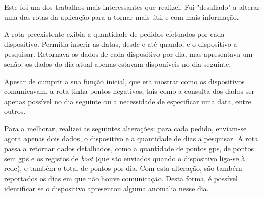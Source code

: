 


Este foi um dos trabalhos mais interessantes que realizei. Fui "desafiado" a alterar uma das rotas da aplicação para a tornar mais útil e com mais informação.

A rota preexistente exibia a quantidade de pedidos efetuados por cada dispositivo. Permitia inserir as datas, desde e até quando, e o dispositivo a pesquisar. Retornava os dados de cada dispositivo por dia, mas apresentava um senão: os dados do dia atual apenas estavam disponíveis no dia seguinte.

Apesar de cumprir a sua função inicial, que era mostrar como os dispositivos comunicavam, a rota tinha pontos negativos, tais como a consulta dos dados ser apenas possível no dia seguinte ou a necessidade de especificar uma data, entre outros.

Para a melhorar, realizei as seguintes alterações: para cada pedido, enviam-se agora apenas dois dados, o dispositivo e a quantidade de dias a pesquisar. A rota passa a retornar dados detalhados, como a quantidade de pontos \acs{gps}, de pontos sem \acs{gps} e os registos de \textit{boot} (que são enviados quando o dispositivo liga-se à rede), e também o total de pontos por dia. Com esta alteração, são também reportados os dias em que não houve comunicação. Desta forma, é possível identificar se o dispositivo apresentou alguma anomalia nesse dia.



